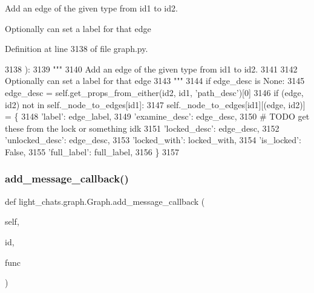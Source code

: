 \begin{DoxyVerb}Add an edge of the given type from id1 to id2.

Optionally can set a label for that edge
\end{DoxyVerb}
 

Definition at line 3138 of file graph.\+py.


\begin{DoxyCode}
3138     ):
3139         \textcolor{stringliteral}{"""}
3140 \textcolor{stringliteral}{        Add an edge of the given type from id1 to id2.}
3141 \textcolor{stringliteral}{}
3142 \textcolor{stringliteral}{        Optionally can set a label for that edge}
3143 \textcolor{stringliteral}{        """}
3144         \textcolor{keywordflow}{if} edge\_desc \textcolor{keywordflow}{is} \textcolor{keywordtype}{None}:
3145             edge\_desc = self.get\_props\_from\_either(id2, id1, \textcolor{stringliteral}{'path\_desc'})[0]
3146         \textcolor{keywordflow}{if} (edge, id2) \textcolor{keywordflow}{not} \textcolor{keywordflow}{in} self.\_node\_to\_edges[id1]:
3147             self.\_node\_to\_edges[id1][(edge, id2)] = \{
3148                 \textcolor{stringliteral}{'label'}: edge\_label,
3149                 \textcolor{stringliteral}{'examine\_desc'}: edge\_desc,
3150                 \textcolor{comment}{# TODO get these from the lock or something idk}
3151                 \textcolor{stringliteral}{'locked\_desc'}: edge\_desc,
3152                 \textcolor{stringliteral}{'unlocked\_desc'}: edge\_desc,
3153                 \textcolor{stringliteral}{'locked\_with'}: locked\_with,
3154                 \textcolor{stringliteral}{'is\_locked'}: \textcolor{keyword}{False},
3155                 \textcolor{stringliteral}{'full\_label'}: full\_label,
3156             \}
3157 
\end{DoxyCode}
\mbox{\label{classlight__chats_1_1graph_1_1Graph_ad445b8282327b777a3419b2a5309237a}} 
\subsubsection{\texorpdfstring{add\+\_\+message\+\_\+callback()}{add\_message\_callback()}}
{\footnotesize\ttfamily def light\+\_\+chats.\+graph.\+Graph.\+add\+\_\+message\+\_\+callback (\begin{DoxyParamCaption}\item[{}]{self,  }\item[{}]{id,  }\item[{}]{func }\end{DoxyParamCaption})}

